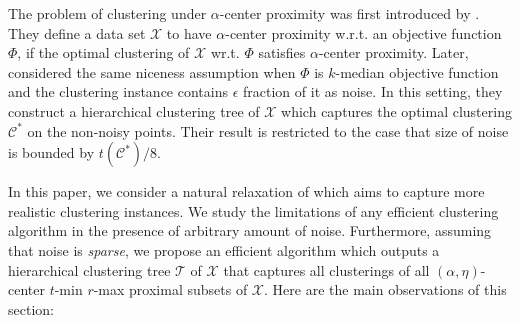\documentclass[anon,12pt]{colt2016} %
\newcommand{\mc}{\mathcal}
\begin{document}
The problem of clustering under $\alpha$-center proximity was first introduced by \cite{awasthi2012center}. They define a data set $\mathcal{X}$ to have $\alpha$-center proximity w.r.t. an objective function $\Phi$, if the optimal clustering of $\mc{X}$ wr.t. $\Phi$ satisfies $\alpha$-center proximity.
Later, \cite{balcan2012clustering} considered the same niceness assumption when $\Phi$ is $k$-median objective function and the clustering instance contains $\epsilon$ fraction of it as noise. In this setting, they construct a hierarchical clustering tree of $\mc{X}$ which captures the optimal clustering $\mc{C}^*$ on the non-noisy points. Their result is restricted to the case that size of noise is bounded by $t(\mc{C}^*)/8$.

In this paper, we consider a natural relaxation of \cite{balcan2012clustering} which aims to capture more realistic clustering instances. We study the limitations of any efficient clustering algorithm in the presence of arbitrary amount of noise. Furthermore, assuming that noise is {\em sparse}, we propose an efficient algorithm which outputs a hierarchical clustering tree $\mc T$ of $\mc X$ that captures all clusterings of all $(\alpha, \eta)$-center $t$-min $r$-max proximal subsets of $\mc X$. Here are the main observations of this section:

\end{document}

